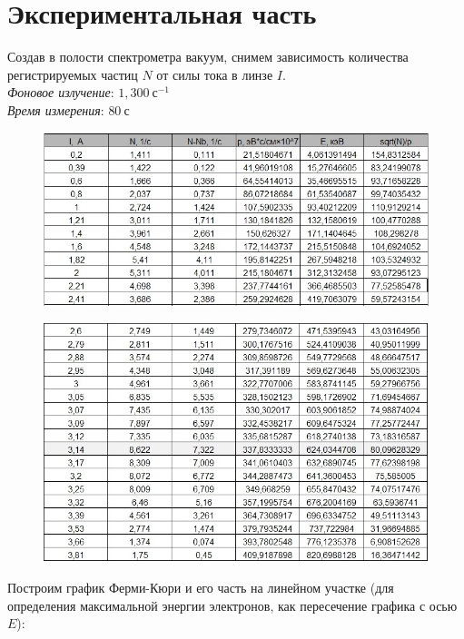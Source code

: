 \documentclass[a4paper,12pt]{article}
\theoremstyle{plain} %
\theoremstyle{definition} %
\theoremstyle{remark} %
\begin{document}
\section*{Экспериментальная часть}

Создав в полости спектрометра вакуум, снимем зависимость количества регистрируемых частиц $N$ от силы тока в линзе $I$. \\

\textit{Фоновое излучение}: $1,300~с^{-1}$\\

\textit{Время измерения}: $80~с$\\ 

\begin{figure}[h!]
	\centering
	\includegraphics[width=0.9\linewidth]{tbl1}
\end{figure}

\begin{figure}[h!]
	\centering
	\includegraphics[width=0.9\linewidth]{tbl2}
\end{figure}

Построим график Ферми-Кюри и его часть на линейном участке (для определения максимальной энергии электронов, как пересечение графика с осью $E$):\\
\end{document}
